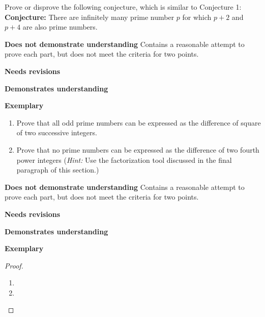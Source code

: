 \documentclass[letterpaper, 11pt]{ximera}
\begin{document}
\begin{ex} Prove or disprove the following conjecture, which is similar to Conjecture 1:
		\textbf{Conjecture:} There are infinitely many prime number $p$ for which $p+2$ and $p+4$ are also prime numbers.
\end{ex}

\begin{writeRubric}
    \item \textbf{Does not demonstrate understanding}
     Contains a reasonable attempt to prove each part, but does not meet the criteria for two points.
    \item \textbf{Needs revisions}
     
    \item \textbf{Demonstrates understanding}
    
    \item \textbf{Exemplary}
        
\end{writeRubric}

\begin{ex} 
		 \begin{enumerate}[label=(\alph*)]
		 	\item Prove that all odd prime numbers can be expressed as the difference of square of two successive integers.
			\item Prove that no prime numbers can be expressed as the difference of two fourth power integers (\emph{Hint:} Use the factorization tool discussed in the final paragraph of this section.)
		\end{enumerate}
\end{ex}

\begin{writeRubric}
    \item \textbf{Does not demonstrate understanding}
     Contains a reasonable attempt to prove each part, but does not meet the criteria for two points.
    \item \textbf{Needs revisions}
     
    \item \textbf{Demonstrates understanding}
    
    \item \textbf{Exemplary}
        
\end{writeRubric}
                                       

\begin{proof}
 	\begin{enumerate}[label=(\alph*)]
		\item %
		\item %
	\end{enumerate}
\end{proof}
\end{document}

